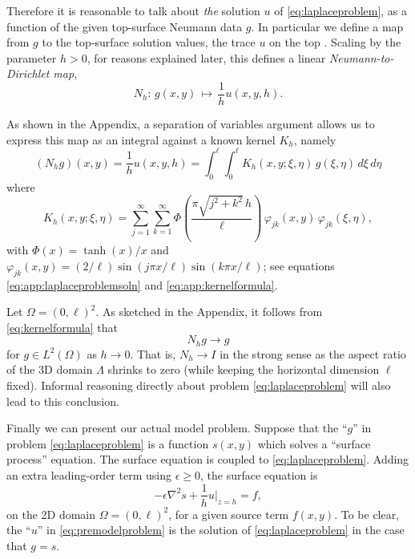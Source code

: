\documentclass[letterpaper,final,12pt,reqno]{amsart}
\theoremstyle{cstyle}
\theoremstyle{cstyle*}
\theoremstyle{dstyle}
\numberwithin{equation}{section}
\newcommand{\eps}{\epsilon}
\newcommand{\grad}{\nabla}
\begin{document}
Therefore it is reasonable to talk about \emph{the} solution $u$ of \eqref{eq:laplaceproblem}, as a function of the given top-surface Neumann data $g$.  In particular we define a map from $g$ to the top-surface solution values, the trace $u$ on the top \cite{Evans2010}.  Scaling by the parameter $h>0$, for reasons explained later, this defines a linear \emph{Neumann-to-Dirichlet map},
\begin{equation}
N_h : \, g(x,y) \, \mapsto \, \frac{1}{h} u(x,y,h).  \label{eq:ntod}
\end{equation}

As shown in the Appendix, a separation of variables argument allows us to express this map as an integral against a known kernel $K_h$, namely
\begin{equation}
(N_h g)(x,y) = \frac{1}{h} u(x,y,h) = \int_0^\ell \int_0^\ell K_h(x,y;\xi,\eta)\, g(\xi,\eta)\,d\xi\,d\eta  \label{eq:ntodformula}
\end{equation}
where
\begin{equation}
K_h(x,y;\xi,\eta) = \sum_{j=1}^\infty \sum_{k=1}^\infty \Phi\left(\frac{\pi \sqrt{j^2+k^2}\,h}{\ell}\right) \, \varphi_{jk}(x,y) \, \varphi_{jk}(\xi,\eta), \label{eq:kernelformula}
\end{equation}
with $\Phi(x)=\tanh(x)/x$ and $\varphi_{jk}(x,y) = (2/\ell) \sin(j\pi x/\ell) \sin(k\pi x/\ell)$; see equations \eqref{eq:app:laplaceproblemsoln} and \eqref{eq:app:kernelformula}.

Let $\Omega = (0,\ell)^2$.  As sketched in the Appendix, it follows from \eqref{eq:kernelformula} that
\begin{equation}
N_h g \to g  \label{eq:ntodasymptotic}
\end{equation}
for $g\in L^2(\Omega)$ as $h\to 0$.  That is, $N_h \to I$ in the strong sense as the aspect ratio of the 3D domain $\Lambda$ shrinks to zero (while keeping the horizontal dimension $\ell$ fixed).  Informal reasoning directly about problem \eqref{eq:laplaceproblem} will also lead to this conclusion.

Finally we can present our actual model problem.  Suppose that the ``$g$'' in problem \eqref{eq:laplaceproblem} is a function $s(x,y)$ which solves a ``surface process'' equation.  The surface equation is coupled to \eqref{eq:laplaceproblem}.  Adding an extra leading-order term using $\eps \ge 0$, the surface equation is
\begin{equation}
-\eps \grad^2 s + \frac{1}{h} u|_{z=h} = f,  \label{eq:premodelproblem}
\end{equation}
on the 2D domain $\Omega = (0,\ell)^2$, for a given source term $f(x,y)$.  To be clear, the ``$u$'' in \eqref{eq:premodelproblem} is the solution of \eqref{eq:laplaceproblem} in the case that $g=s$.
\end{document}
